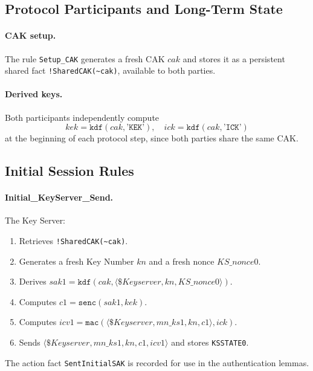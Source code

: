 \subsection{Protocol Participants and Long-Term State}

\paragraph{CAK setup.} The rule \texttt{Setup\_CAK} generates a fresh CAK ${\mathit{cak}}$ and stores it as a persistent shared fact \texttt{!SharedCAK(\textasciitilde cak)}, available to both parties.

\paragraph{Derived keys.} Both participants independently compute
\[
  \mathit{kek} = \mathtt{kdf}(\mathit{cak}, \texttt{'KEK'}),\quad
  \mathit{ick} = \mathtt{kdf}(\mathit{cak}, \texttt{'ICK'})
\]
at the beginning of each protocol step, since both parties share the same CAK.

\subsection{Initial Session Rules}

\paragraph{Initial\_KeyServer\_Send.} The Key Server:
\begin{enumerate}
  \item Retrieves \texttt{!SharedCAK(\textasciitilde cak)}.
  \item Generates a fresh Key Number ${\mathit{kn}}$ and a fresh nonce ${\mathit{KS\_nonce0}}$.
  \item Derives $\mathit{sak1} = \mathtt{kdf}(\mathit{cak}, \langle \$\mathit{Keyserver}, {\mathit{kn}},{\mathit{KS\_nonce0}}\rangle)$.
  \item Computes $\mathit{c1} = \mathtt{senc}(\mathit{sak1}, \mathit{kek})$.
  \item Computes $\mathit{icv1} = \mathtt{mac}(\langle \$\mathit{Keyserver}, \mathit{mn\_ks1},{\mathit{kn}}, \mathit{c1}\rangle, \mathit{ick})$.
  \item Sends $\langle \$\mathit{Keyserver}, \mathit{mn\_ks1}, {\mathit{kn}}, \mathit{c1}, \mathit{icv1}\rangle$ and stores \texttt{KSSTATE0}.
\end{enumerate}
The action fact \texttt{SentInitialSAK} is recorded for use in the authentication lemmas.

